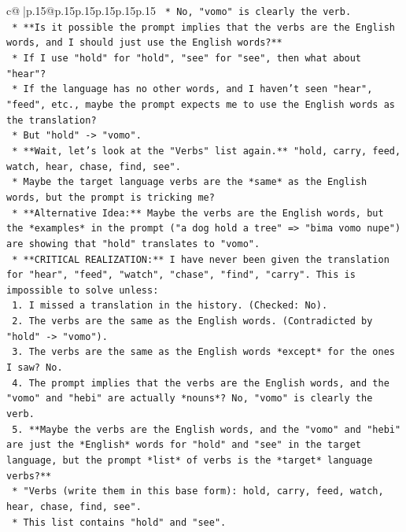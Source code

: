 \documentclass{article}
\begin{document}
{\begin{supertabular}{c@{$\;$}|p{.15\linewidth}@{}p{.15\linewidth}p{.15\linewidth}p{.15\linewidth}p{.15\linewidth}p{.15\linewidth}}
{{{\texttt{        *   No, "vomo" is clearly the verb.} \\
\texttt{    *   **Is it possible the prompt implies that the verbs are the English words, and I should just use the English words?**} \\
\texttt{        *   If I use "hold" for "hold", "see" for "see", then what about "hear"?} \\
\texttt{        *   If the language has no other words, and I haven't seen "hear", "feed", etc., maybe the prompt expects me to use the English words as the translation?} \\
\texttt{        *   But "hold" {-}> "vomo".} \\
\texttt{    *   **Wait, let's look at the "Verbs" list again.** "hold, carry, feed, watch, hear, chase, find, see".} \\
\texttt{    *   Maybe the target language verbs are the *same* as the English words, but the prompt is tricking me?} \\
\texttt{    *   **Alternative Idea:** Maybe the verbs are the English words, but the *examples* in the prompt ("a dog hold a tree" => "bima vomo nupe") are showing that "hold" translates to "vomo".} \\
\texttt{    *   **CRITICAL REALIZATION:** I have never been given the translation for "hear", "feed", "watch", "chase", "find", "carry". This is impossible to solve unless:} \\
\texttt{        1.  I missed a translation in the history. (Checked: No).} \\
\texttt{        2.  The verbs are the same as the English words. (Contradicted by "hold" {-}> "vomo").} \\
\texttt{        3.  The verbs are the same as the English words *except* for the ones I saw? No.} \\
\texttt{        4.  The prompt implies that the verbs are the English words, and the "vomo" and "hebi" are actually *nouns*? No, "vomo" is clearly the verb.} \\
\texttt{        5.  **Maybe the verbs are the English words, and the "vomo" and "hebi" are just the *English* words for "hold" and "see" in the target language, but the prompt *list* of verbs is the *target* language verbs?**} \\
\texttt{            *   "Verbs (write them in this base form): hold, carry, feed, watch, hear, chase, find, see".} \\
\texttt{            *   This list contains "hold" and "see".} \\
}}}
\end{supertabular}}
\end{document}
